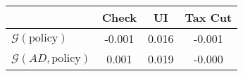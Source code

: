 \begin{tabular}{@{}lccc@{}} 
\toprule 
                          & Check      & UI    & Tax Cut    \\  \midrule 
$\mathcal{G}(\text{policy})$ & -0.001  & 0.016  & -0.001     \\ 
$\mathcal{G}(AD,\text{policy})$ & 0.001  & 0.019  & -0.000     \\ 
\end{tabular}  
